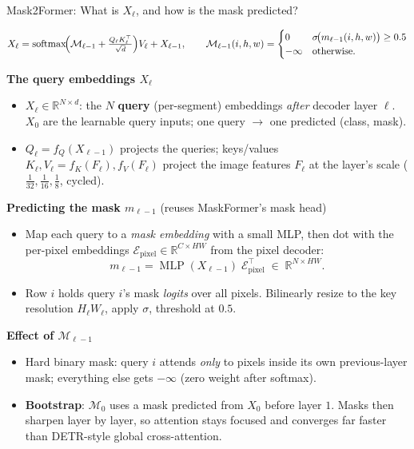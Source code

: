 \begin{frame}{Mask2Former: What is $X_\ell$, and how is the mask predicted?}

  \[
    X_\ell = \operatorname{softmax}\!\Bigl(\mathcal{M}_{\ell-1} + \tfrac{Q_\ell K_\ell^\top}{\sqrt{d}}\Bigr) V_\ell + X_{\ell-1},
    \qquad
    \mathcal{M}_{\ell-1}(i, h, w) = \begin{cases} 0 & \sigma\!\bigl(m_{\ell-1}(i,h,w)\bigr) \geq 0.5 \\ -\infty & \text{otherwise.}\end{cases}
  \]

  \textbf{The query embeddings $X_\ell$}
  \begin{itemize}\setlength\itemsep{2pt}
    \item $X_\ell \in \mathbb{R}^{N\times d}$: the $N$ \textbf{query} (per-segment) embeddings \emph{after} decoder layer $\ell$. $X_0$ are the learnable query inputs; one query $\to$ one predicted (class, mask).
    \item $Q_\ell = f_Q(X_{\ell-1})$ projects the queries; keys/values $K_\ell, V_\ell = f_K(F_\ell), f_V(F_\ell)$ project the image features $F_\ell$ at the layer's scale ($\tfrac{1}{32},\tfrac{1}{16},\tfrac{1}{8}$, cycled).
  \end{itemize}

  \vspace{0.4em}
  \textbf{Predicting the mask $m_{\ell-1}$} (reuses MaskFormer's mask head)
  \begin{itemize}\setlength\itemsep{2pt}
    \item Map each query to a \emph{mask embedding} with a small MLP, then dot with the per-pixel embeddings $\mathcal{E}_\text{pixel} \in \mathbb{R}^{C\times H W}$ from the pixel decoder:
      \[
        m_{\ell-1} = \operatorname{MLP}(X_{\ell-1})\;\mathcal{E}_\text{pixel}^\top \;\in\; \mathbb{R}^{N\times HW}.
      \]
    \item Row $i$ holds query $i$'s mask \emph{logits} over all pixels. Bilinearly resize to the key resolution $H_\ell W_\ell$, apply $\sigma$, threshold at $0.5$.
  \end{itemize}

  \vspace{0.4em}
  \textbf{Effect of $\mathcal{M}_{\ell-1}$}
  \begin{itemize}\setlength\itemsep{2pt}
    \item Hard binary mask: query $i$ attends \emph{only} to pixels inside its own previous-layer mask; everything else gets $-\infty$ (zero weight after softmax).
    \item \textbf{Bootstrap}: $\mathcal{M}_0$ uses a mask predicted from $X_0$ before layer $1$. Masks then sharpen layer by layer, so attention stays focused and converges far faster than DETR-style global cross-attention.
  \end{itemize}
\end{frame}

